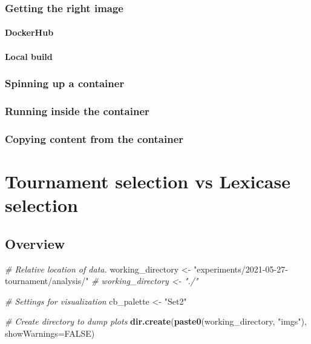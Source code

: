 \documentclass[]{book}
\newenvironment{Shaded}{\begin{snugshade}}{\end{snugshade}}
\newcommand{\CommentTok}[1]{\textcolor[rgb]{0.56,0.35,0.01}{\textit{#1}}}
\newcommand{\DataTypeTok}[1]{\textcolor[rgb]{0.13,0.29,0.53}{#1}}
\newcommand{\KeywordTok}[1]{\textcolor[rgb]{0.13,0.29,0.53}{\textbf{#1}}}
\newcommand{\NormalTok}[1]{#1}
\newcommand{\OtherTok}[1]{\textcolor[rgb]{0.56,0.35,0.01}{#1}}
\newcommand{\StringTok}[1]{\textcolor[rgb]{0.31,0.60,0.02}{#1}}
\begin{document}
\hypertarget{getting-the-right-image}{%
\subsection{Getting the right image}\label{getting-the-right-image}}

\hypertarget{dockerhub}{%
\subsubsection{DockerHub}\label{dockerhub}}

\hypertarget{local-build}{%
\subsubsection{Local build}\label{local-build}}

\hypertarget{spinning-up-a-container}{%
\subsection{Spinning up a container}\label{spinning-up-a-container}}

\hypertarget{running-inside-the-container}{%
\subsection{Running inside the container}\label{running-inside-the-container}}

\hypertarget{copying-content-from-the-container}{%
\subsection{Copying content from the container}\label{copying-content-from-the-container}}

\hypertarget{tournament-selection-vs-lexicase-selection}{%
\chapter{Tournament selection vs Lexicase selection}\label{tournament-selection-vs-lexicase-selection}}

\hypertarget{overview}{%
\section{Overview}\label{overview}}

\begin{Shaded}
\begin{Highlighting}[]
\CommentTok{# Relative location of data.}
\NormalTok{working_directory <-}\StringTok{ "experiments/2021-05-27-tournament/analysis/"}
\CommentTok{# working_directory <- "./"}

\CommentTok{# Settings for visualization}
\NormalTok{cb_palette <-}\StringTok{ "Set2"}

\CommentTok{# Create directory to dump plots}
\KeywordTok{dir.create}\NormalTok{(}\KeywordTok{paste0}\NormalTok{(working_directory, }\StringTok{"imgs"}\NormalTok{), }\DataTypeTok{showWarnings=}\OtherTok{FALSE}\NormalTok{)}
\end{Highlighting}
\end{Shaded}
\end{document}
